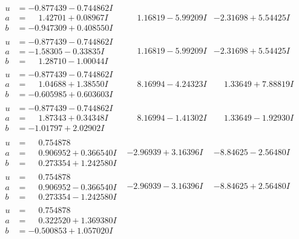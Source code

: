 \documentclass[1p]{elsarticle_modified}
\theoremstyle{definition}
\begin{document}
$$\begin{array}{c|c|c}
\begin{aligned}
u &= -0.877439 - 0.744862 I \\
a &= \phantom{-}1.42701 + 0.08967 I \\
b &= -0.947309 + 0.408550 I\end{aligned}
 & \phantom{-}1.16819 - 5.99209 I & -2.31698 + 5.54425 I \\ \hline\begin{aligned}
u &= -0.877439 - 0.744862 I \\
a &= -1.58305 - 0.33835 I \\
b &= \phantom{-}1.28710 - 1.00044 I\end{aligned}
 & \phantom{-}1.16819 - 5.99209 I & -2.31698 + 5.54425 I \\ \hline\begin{aligned}
u &= -0.877439 - 0.744862 I \\
a &= \phantom{-}1.04688 + 1.38550 I \\
b &= -0.605985 + 0.603603 I\end{aligned}
 & \phantom{-}8.16994 - 4.24323 I & \phantom{-}1.33649 + 7.88819 I \\ \hline\begin{aligned}
u &= -0.877439 - 0.744862 I \\
a &= \phantom{-}1.87343 + 0.34348 I \\
b &= -1.01797 + 2.02902 I\end{aligned}
 & \phantom{-}8.16994 - 1.41302 I & \phantom{-}1.33649 - 1.92930 I \\ \hline\begin{aligned}
u &= \phantom{-}0.754878\phantom{ +0.000000I} \\
a &= \phantom{-}0.906952 + 0.366540 I \\
b &= \phantom{-}0.273354 + 1.242580 I\end{aligned}
 & -2.96939 + 3.16396 I & -8.84625 - 2.56480 I \\ \hline\begin{aligned}
u &= \phantom{-}0.754878\phantom{ +0.000000I} \\
a &= \phantom{-}0.906952 - 0.366540 I \\
b &= \phantom{-}0.273354 - 1.242580 I\end{aligned}
 & -2.96939 - 3.16396 I & -8.84625 + 2.56480 I \\ \hline\begin{aligned}
u &= \phantom{-}0.754878\phantom{ +0.000000I} \\
a &= \phantom{-}0.322520 + 1.369380 I \\
b &= -0.500853 + 1.057020 I\end{aligned}

\end{array}$$
\end{document}
